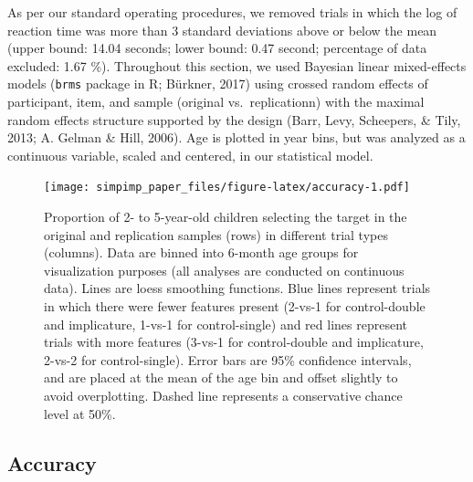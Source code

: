 \documentclass[man]{apa6}
\theoremstyle{definition}
\theoremstyle{definition}
\theoremstyle{definition}
\theoremstyle{remark}
\begin{document}
As per our standard operating procedures, we removed trials in which the
log of reaction time was more than 3 standard deviations above or below
the mean (upper bound: 14.04 seconds; lower bound: 0.47 second;
percentage of data excluded: 1.67 \%). Throughout this section, we used
Bayesian linear mixed-effects models (\texttt{brms} package in R;
Bürkner, 2017) using crossed random effects of participant, item, and
sample (original vs.~replicationn) with the maximal random effects
structure supported by the design (Barr, Levy, Scheepers, \& Tily, 2013;
A. Gelman \& Hill, 2006). Age is plotted in year bins, but was analyzed
as a continuous variable, scaled and centered, in our statistical model.

\begin{figure}
\centering
\texttt{[image: simpimp\_paper\_files/figure-latex/accuracy-1.pdf]}
\caption{\label{fig:accuracy}Proportion of 2- to 5-year-old children
selecting the target in the original and replication samples (rows) in
different trial types (columns). Data are binned into 6-month age groups
for visualization purposes (all analyses are conducted on continuous
data). Lines are loess smoothing functions. Blue lines represent trials
in which there were fewer features present (2-vs-1 for control-double
and implicature, 1-vs-1 for control-single) and red lines represent
trials with more features (3-vs-1 for control-double and implicature,
2-vs-2 for control-single). Error bars are 95\% confidence intervals,
and are placed at the mean of the age bin and offset slightly to avoid
overplotting. Dashed line represents a conservative chance level at
50\%.}
\end{figure}

\subsection{Accuracy}\label{accuracy}
\end{document}
